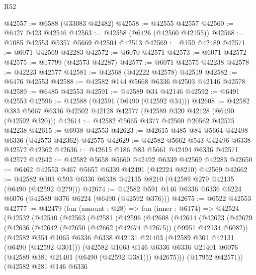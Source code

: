 \begin{lexlean}{R52}
\begin{coremodule}
@42557 := @6588 (@33083 @42482)
@42558 := @42555 @42557
@42560 := @6427 @423 @42546
@42563 := @42558 (@6426 (@42560 @42155))
@42568 := @7085 @42553 @5357 @5669 @42504 @42513
@42569 := @159 @42489
@42571 := @6071 @42569 @42283
@42572 := @6070 @42571
@42573 := @6071 @42572
@42575 := @17799 (@42573 @42287)
@42577 := @6071 @42575 @42238
@42578 := @42223 @42577
@42581 := @42568 (@42222 @42578) @42519
@42582 := @6476 @42553
@42588 := @42582 @144 @5668 @6336 @42503 @42146 @42578
@42589 := @6485 @42553
@42591 := @42589 @34 @42146
@42592 := @6491 @42553
@42596 := @42588 (@42591 (@6490 (@42592 @34)))
@42608 := @42582 @383 @5667 @6336 @42502 @42128 @42577 (@42589 @320 @42128 (@6490 (@42592 @320)))
@42614 := @42582 @5665 @4377 @42500 @20562 @42575 @42238
@42615 := @6938 @42553
@42623 := @42615 @485 @84 @5664 @42498 @6336 (@42573 @42362) @42575
@42629 := @42582 @5662 @543 @42496 @6338 @42572 @42362
@42636 := @42615 @186 @83 @5661 @42494 @6336 @42571 @42572
@42642 := @42582 @5658 @5660 @42492 @6339 @42569 @42283
@42650 := @6462 @42553 @467 @5657 @6339 @42491 (@42224 @8210) @42569
@42662 := @42582 @303 @593 @6336 @6338 @42135 @8210 (@42589 @279 @42135 (@6490 (@42592 @279)))
@42674 := @42582 @591 @146 @6336 @6336 @6224 @6076 (@42589 @376 @6224 (@6490 (@42592 @376)))
@42675 := @6522 @42553
@42777 := @42479
    (fun (amount : @28) =>
    fun (inner : @6174) =>
    @42524
      (@42532
        (@42540
          (@42563
            (@42581
              (@42596
                (@42608
                  (@42614
                    (@42623
                      (@42629
                        (@42636
                          (@42642
                            (@42650 (@42662 (@42674 @42675)) (@9951 @42134 @6082))
                            (@42582
                              @354
                              @1065
                              @6336
                              @6338
                              @42131
                              @21403
                              (@42589 @301 @42131 (@6490 (@42592 @301)))
                              (@42582
                                @1063
                                @146
                                @6336
                                @6336
                                @21401
                                @6076
                                (@42589 @381 @21401 (@6490 (@42592 @381)))
                                @42675)))
                          (@17952 @42571))
                        (@42582
                          @281
                          @146
                          @6336

\end{coremodule}
\end{lexlean}
